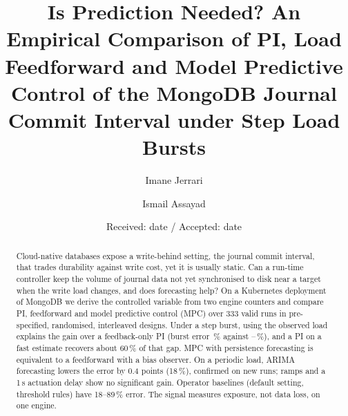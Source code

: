 \documentclass[smallextended]{svjour3}
\begin{document}
\title{Is Prediction Needed? An Empirical Comparison of PI, Load Feedforward and
Model Predictive Control of the MongoDB Journal Commit Interval under Step Load Bursts}

\author{Imane Jerrari \and Ismail Assayad}


\date{Received: date / Accepted: date}
\maketitle

\begin{abstract}
Cloud-native databases expose a write-behind setting, the journal commit interval, that trades durability against write cost, yet it is usually static. Can a run-time controller keep the volume of journal data not yet synchronised to disk near a target when the write load changes, and does forecasting help? On a Kubernetes deployment of MongoDB we derive the controlled variable from two engine counters and compare PI, feedforward and model predictive control (MPC) over 333 valid runs in pre-specified, randomised, interleaved designs. Under a step burst, using the observed load explains the gain over a feedback-only PI (burst error \MaePITS\,\% against \MaePIFFS--\MaeMPCMS\,\%), and a PI on a fast estimate recovers about 60\,\% of that gap. MPC with persistence forecasting is equivalent to a feedforward with a bias observer. On a periodic load, ARIMA forecasting lowers the error by 0.4 points (18\,\%), confirmed on new runs; ramps and a 1\,s actuation delay show no significant gain. Operator baselines (default setting, threshold rules) have 18--89\,\% error. The signal measures exposure, not data loss, on one engine.
\end{abstract}
\end{document}
